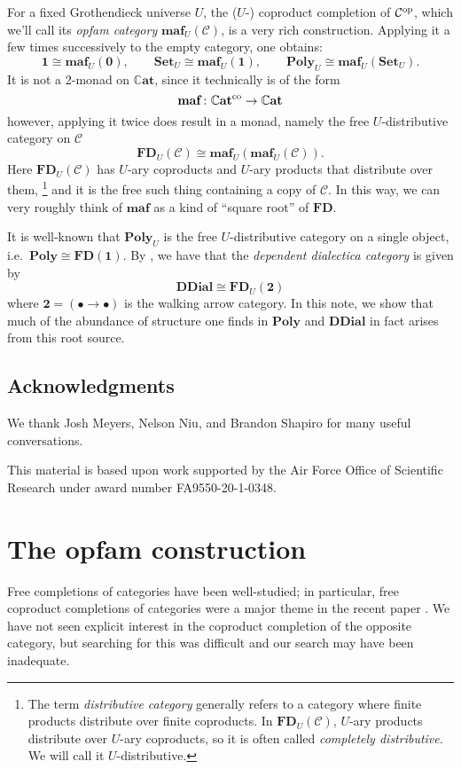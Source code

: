 \documentclass[11pt, one side, article]{memoir}
\theoremstyle{definition}
\theoremstyle{plain}
\newcommand{\cat}[1]{\mathcal{#1}}%
\newcommand{\Cat}[1]{\mathbf{#1}}%
\newcommand{\op}{^\tn{op}}
\newcommand{\co}{^\tn{co}}
\newcommand{\tn}[1]{\textnormal{#1}}
\newcommand{\smset}{\Cat{Set}}
\newcommand{\smcat}{\mathbb{C}\Cat{at}}
\newcommand{\poly}{\Cat{Poly}}
\newcommand{\0}{\Cat{0}}
\newcommand{\1}{\Cat{1}}
\newcommand{\fd}{\Cat{FD}}
\newcommand{\opfam}{\Cat{maf}}
\newcommand{\ddial}{\Cat{DDial}}
\begin{document}
For a fixed Grothendieck universe $U$, the ($U$-) coproduct completion of $\cat{C}\op$, which we'll call its \emph{opfam category} $\opfam_U(\cat{C})$, is a very rich construction. Applying it a few times successively to the empty category, one obtains:
\[
	\1\cong \opfam_U(\0),\qquad
	\smset_U\cong\opfam_U(\1),\qquad
	\poly_U\cong\opfam_U(\smset_U).
\]
It is not a 2-monad on $\smcat$, since it technically is of the form
\[
\opfam\colon\smcat\co\to\smcat
\]
however, applying it twice does result in a monad, namely the free $U$-distributive category on $\cat{C}$
\[
\fd_U(\cat{C})\cong\opfam_U(\opfam_U(\cat{C})).
\]
Here $\fd_U(\cat{C})$ has $U$-ary coproducts and $U$-ary products that distribute over them,%
\footnote{The term \emph{distributive category} generally refers to a category where finite products distribute over finite coproducts. In $\fd_U(\cat{C})$, $U$-ary products distribute over $U$-ary coproducts, so it is often called \emph{completely distributive}. We will call it $U$-distributive.}
 and it is the free such thing containing a copy of $\cat{C}$. In this way, we can very roughly think of $\opfam$ as a kind of ``square root'' of $\fd$. 

It is well-known that $\poly_U$ is the free $U$-distributive category on a single object, i.e.\ $\poly\cong\fd(\1)$. By \cite{moss2018dialectica}, we have that the \emph{dependent dialectica category} is given by 
\[\ddial\cong\fd_U(\Cat{2})\]
where $\Cat{2}=(\bullet\to\bullet)$ is the walking arrow category. In this note, we show that much of the abundance of structure one finds in $\poly$ and $\ddial$ in fact arises from this root source.

\section*{Acknowledgments}
We thank Josh Meyers, Nelson Niu, and Brandon Shapiro for many useful conversations.  

This material is based upon work supported by the Air Force Office of Scientific Research under award number FA9550-20-1-0348.


\chapter{The opfam construction}

Free completions of categories have been well-studied; in particular, free coproduct completions of categories were a major theme in the recent paper \cite{adamek2020nice}. We have not seen explicit interest in the coproduct completion of the opposite category, but searching for this was difficult and our search may have been inadequate.
\end{document}
